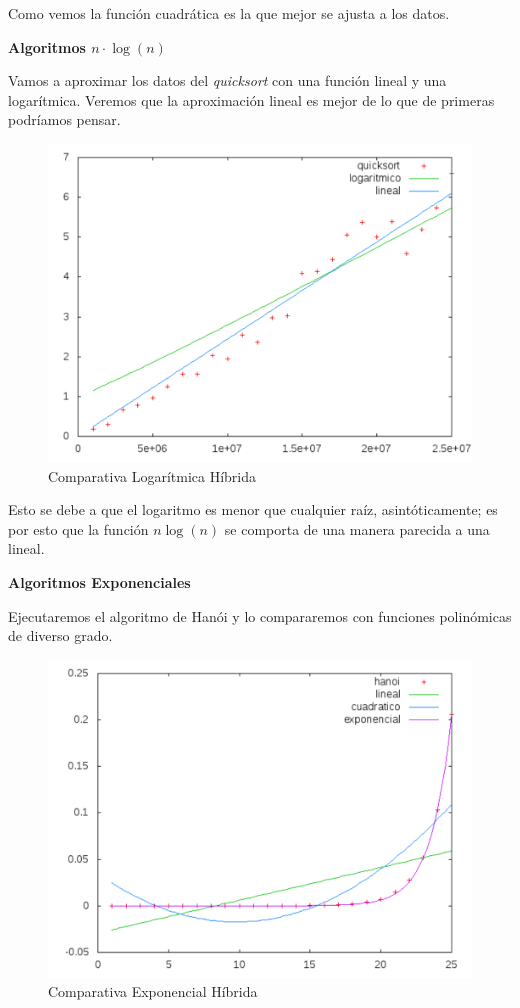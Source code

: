 \documentclass[a4paper, 11pt]{article}
\begin{document}
Como vemos la función cuadrática es la que mejor se ajusta a los datos.

\vspace{1cm}

\textbf{Algoritmos $n \cdot \log(n)$}

Vamos a aproximar los datos del \textit{quicksort} con una función lineal y una logarítmica. Veremos que la aproximación lineal es mejor de lo que de primeras podríamos pensar.


\begin{figure}[H]\includegraphics[width=13cm]{img/log_hibrida.pdf} \centering
	\caption{Comparativa Logarítmica Híbrida}\end{figure}

Esto se debe a que el logaritmo es menor que cualquier raíz, asintóticamente; es por esto que la función $n \log(n)$ se comporta de una manera parecida a una lineal.


\vspace{1cm}

\textbf{Algoritmos Exponenciales}

Ejecutaremos el algoritmo de Hanói y lo compararemos con funciones polinómicas de diverso grado.

\begin{figure}[H]\includegraphics[width=13cm]{img/expo_hibrida2.pdf} \centering
	\caption{Comparativa Exponencial Híbrida}\end{figure}
\end{document}
